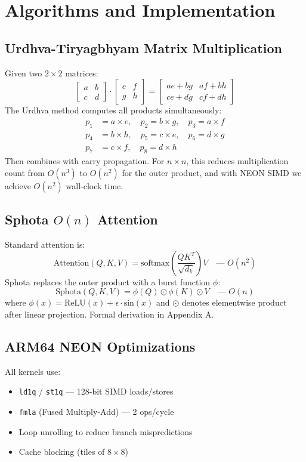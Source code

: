 \documentclass[12pt, a4paper]{article}
\begin{document}
\section{Algorithms and Implementation}

\subsection{Urdhva-Tiryagbhyam Matrix Multiplication}
Given two $2\times2$ matrices:
\[
\begin{bmatrix} a & b \\ c & d \end{bmatrix}
\cdot
\begin{bmatrix} e & f \\ g & h \end{bmatrix}
=
\begin{bmatrix} 
ae+bg & af+bh \\
ce+dg & cf+dh
\end{bmatrix}
\]
The Urdhva method computes all products simultaneously:
\begin{align*}
p_1 &= a \times e,\quad p_2 = b \times g,\quad p_3 = a \times f \\
p_4 &= b \times h,\quad p_5 = c \times e,\quad p_6 = d \times g \\
p_7 &= c \times f,\quad p_8 = d \times h
\end{align*}
Then combines with carry propagation. For $n\times n$, this reduces multiplication count from $O(n^3)$ to $O(n^2)$ for the outer product, and with NEON SIMD we achieve $O(n^2)$ wall-clock time.

\subsection{Sphota $O(n)$ Attention}
Standard attention is:
\[
\text{Attention}(Q,K,V) = \text{softmax}\left(\frac{QK^T}{\sqrt{d_k}}\right)V \quad \text{— } O(n^2)
\]
Sphota replaces the outer product with a burst function $\phi$:
\[
\text{Sphota}(Q,K,V) = \phi(Q) \odot \phi(K) \odot V \quad \text{— } O(n)
\]
where $\phi(x) = \text{ReLU}(x) + \epsilon \cdot \text{sin}(x)$ and $\odot$ denotes elementwise product after linear projection. Formal derivation in Appendix A.

\subsection{ARM64 NEON Optimizations}
All kernels use:
\begin{itemize}
    \item \texttt{ld1q} / \texttt{st1q} — 128-bit SIMD loads/stores
    \item \texttt{fmla} (Fused Multiply-Add) — 2 ops/cycle
    \item Loop unrolling to reduce branch mispredictions
    \item Cache blocking (tiles of $8\times8$)
\end{itemize}
\end{document}
